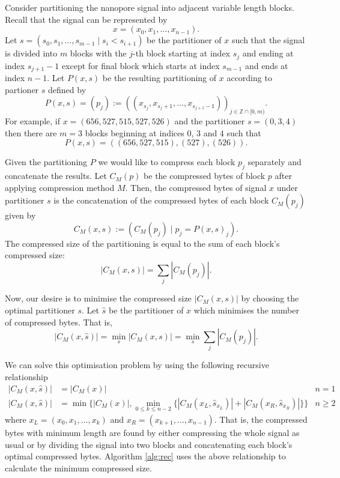 Consider partitioning the nanopore signal into adjacent variable length
blocks. Recall that the signal can be represented by
\[ x = (x_0,x_1,\dots,x_{n-1}). \]
Let $s=(s_0,s_1,\dots,s_{m-1}\mid s_i<s_{i+1})$ be the partitioner of $x$ such
that the signal is divided into $m$ blocks with the $j$-th block starting at
index $s_j$ and ending at index $s_{j+1}-1$ except for final block which starts
at index $s_{m-1}$ and ends at index $n-1$. Let $P(x,s)$ be the resulting
partitioning of $x$ according to partioner $s$ defined by
\[ P(x,s) = (p_j) := ((x_{s_j},x_{s_j+1},\dots,x_{s_{j+1}-1}))_{j\in\mathbb{Z}\cap[0,m)}.\]
For example, if $x=(656,527,515,527,526)$ and the partitioner $s = (0,3,4)$ then
there are $m=3$ blocks beginning at indices 0, 3 and 4 such that
\[P(x,s)=((656,527,515),(527),(526)).\]

Given the partitioning $P$ we would like to compress each block $p_j$
separately and concatenate the results. Let $C_M(p)$ be the compressed bytes of
block $p$ after applying compression method $M$. Then, the compressed bytes
of signal $x$ under partitioner $s$ is the concatenation of the compressed bytes
of each block $C_M(p_j)$ given by
\[ C_M(x,s) := (C_M(p_j)\mid p_j=P(x,s)_j). \]
The compressed size of the partitioning is equal to the sum of each block's compressed size:
\[ |C_M(x,s)| = \sum_j|C_M(p_j)|. \]

Now, our desire is to minimise the compressed size $|C_M(x,s)|$ by choosing the
optimal partitioner $s$. Let $\hat s$ be the partitioner of $x$ which minimises
the number of compressed bytes. That is,
\[ |C_M(x,\hat s)| = \min_s |C_M(x,s)| = \min_s \sum_j|C_M(p_j)|. \]

We can solve this optimisation problem by using the following recursive
relationship
\begin{align*}
	|C_M(x,\hat s)| &= |C_M(x)| & n = 1\\
	|C_M(x,\hat s)| &= \min\{|C_M(x)|,\min_{0\le k\le n-2}\{|C_M(x_L,\hat s_{x_L})| + |C_M(x_R,\hat s_{x_R})|\}\} & n\ge 2
\end{align*}
where $x_L=(x_0,x_1,\dots,x_k)$ and $x_R=(x_{k+1},\dots,x_{n-1})$.
That is, the compressed bytes with minimum length are found by either
compressing the whole signal as usual or by dividing the signal into two blocks
and concatenating each block's optimal compressed bytes. Algorithm \ref{alg:rec}
uses the above relationship to calculate the minimum compressed size.

